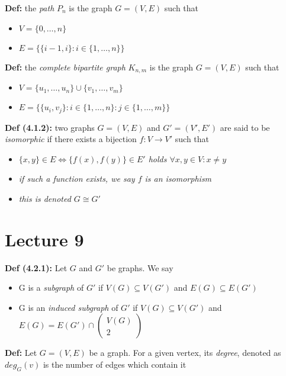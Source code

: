 \documentclass[12pt]{article}
\begin{document}
\textbf{Def: }the \emph{path} $P_n$ is the graph $G = (V, E)$ such that
\begin{itemize}
    \item \emph{$V = \{ 0, \dots, n \}$}
    \item \emph{$E = \{ \{ i - 1, i \} : i \in \{ 1, \dots, n\} \}$}
\end{itemize}

\textbf{Def: }the \emph{complete bipartite graph} $K_{n, m}$ is the graph $G = (V, E)$ such that
\begin{itemize}
    \item \emph{$V = \{ u_1, \dots, u_n \} \cup \{ v_1, \dots, v_m \}$}
    \item \emph{$E = \{ \{ u_i, v_j \} : i \in \{ 1, \dots, n \} : j \in \{ 1, \dots, m \} \} $}
\end{itemize}

\textbf{Def (4.1.2): }two graphs $G = (V, E)$ and $G' = (V', E')$ are said to be \emph{isomorphic} if there exists a bijection $f: V \rightarrow V'$ such that
\begin{itemize}
    \item \emph{$\{ x, y \} \in E \Leftrightarrow \{ f(x), f(y) \} \in E'$ holds $\forall x, y \in V : x 
    \neq y$}
    \item \emph{if such a function exists, we say $f$ is an isomorphism}
    \item \emph{this is denoted $G \cong G'$}
\end{itemize}
\clearpage

\section{Lecture 9}

\textbf{Def (4.2.1): }Let $G$ and $G'$ be graphs. We say
\begin{itemize}
    \item G is a \emph{subgraph} of $G'$ if $V(G) \subseteq V(G')$ and $E(G) \subseteq E(G')$
    \item G is an \emph{induced subgraph} of $G'$ if $V(G) \subseteq V(G')$ and $E(G) = E(G') \cap \begin{pmatrix} V(G) \\ 2  \end{pmatrix}$
\end{itemize}

\textbf{Def: }Let $G = (V, E)$ be a graph. For a given vertex, its \emph{degree}, denoted as $deg_{G}(v)$ is the number of edges which contain it
\end{document}
